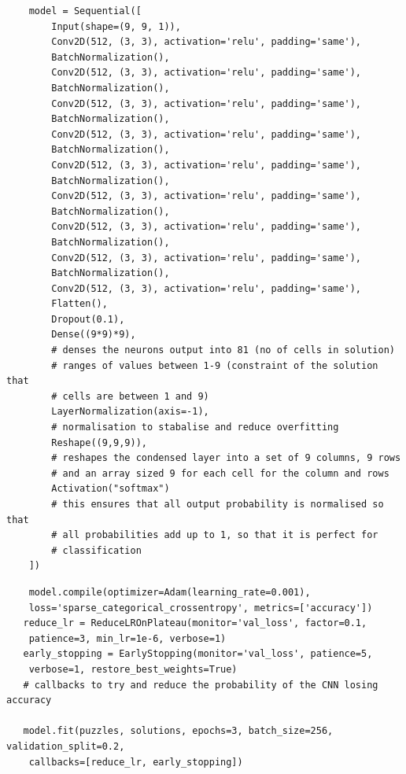 \documentclass[]{final_report}
\begin{document}
\begin{verbatim}
    model = Sequential([
        Input(shape=(9, 9, 1)),
        Conv2D(512, (3, 3), activation='relu', padding='same'),
        BatchNormalization(),
        Conv2D(512, (3, 3), activation='relu', padding='same'),
        BatchNormalization(),
        Conv2D(512, (3, 3), activation='relu', padding='same'),
        BatchNormalization(),
        Conv2D(512, (3, 3), activation='relu', padding='same'),
        BatchNormalization(),
        Conv2D(512, (3, 3), activation='relu', padding='same'),
        BatchNormalization(),
        Conv2D(512, (3, 3), activation='relu', padding='same'),
        BatchNormalization(),
        Conv2D(512, (3, 3), activation='relu', padding='same'),
        BatchNormalization(),
        Conv2D(512, (3, 3), activation='relu', padding='same'),
        BatchNormalization(),
        Conv2D(512, (3, 3), activation='relu', padding='same'),
        Flatten(),
        Dropout(0.1),
        Dense((9*9)*9),
        # denses the neurons output into 81 (no of cells in solution) 
        # ranges of values between 1-9 (constraint of the solution that 
        # cells are between 1 and 9)
        LayerNormalization(axis=-1),
        # normalisation to stabalise and reduce overfitting
        Reshape((9,9,9)),
        # reshapes the condensed layer into a set of 9 columns, 9 rows 
        # and an array sized 9 for each cell for the column and rows
        Activation("softmax")
        # this ensures that all output probability is normalised so that 
        # all probabilities add up to 1, so that it is perfect for 
        # classification
    ])
\end{verbatim}

\begin{verbatim}
    model.compile(optimizer=Adam(learning_rate=0.001), 
    loss='sparse_categorical_crossentropy', metrics=['accuracy'])
   reduce_lr = ReduceLROnPlateau(monitor='val_loss', factor=0.1, 
    patience=3, min_lr=1e-6, verbose=1)
   early_stopping = EarlyStopping(monitor='val_loss', patience=5, 
    verbose=1, restore_best_weights=True)
   # callbacks to try and reduce the probability of the CNN losing accuracy

   model.fit(puzzles, solutions, epochs=3, batch_size=256, validation_split=0.2,
    callbacks=[reduce_lr, early_stopping])
\end{verbatim}
\end{document}
